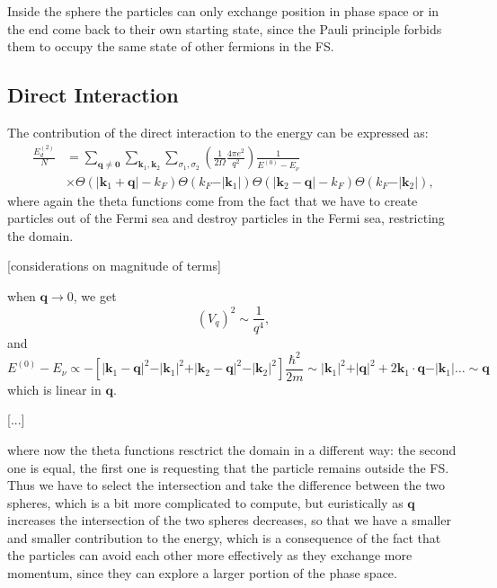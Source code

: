 Inside the sphere the particles can only exchange position in phase space or in the end come back to their own starting state, since the Pauli principle forbids them to occupy the same state of other fermions in the FS.

\subsection{Direct Interaction}

The contribution of the direct interaction to the energy can be expressed as:
\[
    \begin{aligned}
        \frac{E^{(2)}_d}{N} & = \sum_{\mathbf{q} \neq \mathbf{0}} \sum_{\mathbf{k}_1, \mathbf{k}_2} \sum_{\sigma_1, \sigma_2}  \left(\frac{1}{2\Omega} \frac{4 \pi e^2}{q^2}\right) \frac{1}{E^{(0)}- E_\nu}              \\
                            & \times \Theta(\vert \mathbf{k}_1 + \mathbf{q} \vert -k_F) \Theta(k_F - \vert \mathbf{k}_1 \vert) \Theta(\vert \mathbf{k}_2 - \mathbf{q} \vert -k_F) \Theta(k_F - \vert \mathbf{k}_2 \vert),
    \end{aligned}
\]
where again the theta functions come from the fact that we have to create particles out of the Fermi sea and destroy particles in the Fermi sea, restricting the domain.

    [considerations on magnitude of terms]

when \(\mathbf{q} \to 0\), we get
\[
    (V_q)^2 \sim \frac{1}{q^4},
\]
and
\[
    E^{(0)}-E_\nu \propto - \left[ \vert \mathbf{k}_1 - \mathbf{q} \vert^2 - \vert \mathbf{k}_1 \vert^2 + \vert \mathbf{k}_2 - \mathbf{q} \vert^2 - \vert \mathbf{k}_2 \vert^2 \right] \frac{\hbar^2}{2m} \sim \vert \mathbf{k}_1 \vert^2 + \vert \mathbf{q} \vert^2 + 2 \mathbf{k}_1 \cdot \mathbf{q} - \vert \mathbf{k}_1 \vert\dots   \sim \mathbf{q}
\]
which is linear in \(\mathbf{q}\).


    [...]


where now the theta functions resctrict the domain in a different way: the second one is equal, the first one is requesting that the particle remains outside the FS. Thus we have to select the intersection and take the difference between the two spheres, which is a bit more complicated to compute, but euristically as \(\mathbf{q}\) increases the intersection of the two spheres decreases, so that we have a smaller and smaller contribution to the energy, which is a consequence of the fact that the particles can avoid each other more effectively as they exchange more momentum, since they can explore a larger portion of the phase space.


